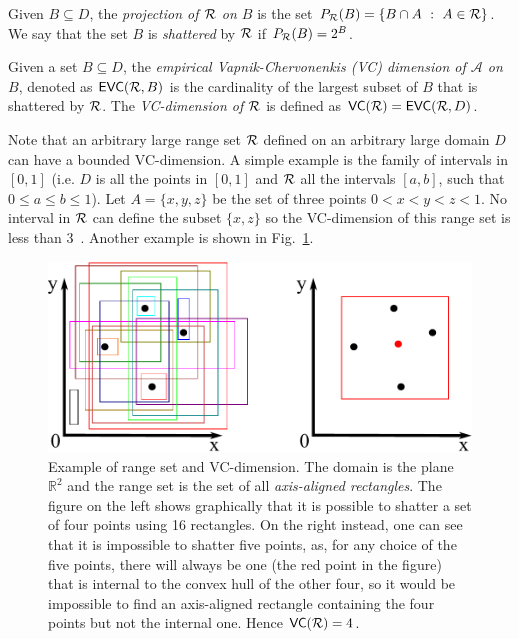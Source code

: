 Given $B\subseteq D$, the \emph{projection of $\mathcal{R}$ on $B$} is the set 
$P_{\mathcal{R}}(B)=\{ B\cap A ~:~ A\in\mathcal{R}\}$. We say that the set $B$ is
\emph{shattered} by $\mathcal{R}$ if $P_{\mathcal{R}}(B)=2^B$.

\begin{definition}\label{def:empvcdim}
  Given a set $B\subseteq D$, the \emph{empirical Vapnik-Chervonenkis
  (VC) dimension of $\mathcal{A}$ on $B$}, denoted as $\mathsf{EVC}(\mathcal{R},B)$ is
  the cardinality of the largest subset of $B$ that is shattered by
  $\mathcal{R}$. The \emph{VC-dimension of $\mathcal{R}$} is defined as $\mathsf{VC}(\mathcal{R})=\mathsf{EVC}(\mathcal{R},D)$.
\end{definition}

Note that an arbitrary large range set $\mathcal{R}$ defined on an arbitrary large
domain $D$ can have a bounded VC-dimension. A simple
example is the family of intervals in $[0,1]$ (i.e. $D$ is all the points in
$[0,1]$ and $\mathcal{R}$ all the intervals $[a,b]$, such that $0\leq a\leq b\leq 1$). Let
$A=\{x,y,z\}$ be the set of three points $0<x<y<z<1$. No interval in $\mathcal{R}$ can
define the subset $\{x,z\}$ so the VC-dimension of this range set is less than
3~\cite[Lemma 10.3.1]{Matousek02}. Another example is shown in
Fig.~\ref{fig:rectangles}.
\begin{figure}[ht]
  \centering
  \includegraphics[width=.7\textwidth,keepaspectratio]{rectangles}
  \caption{Example of range set and VC-dimension. The domain is the
  plane $\mathbb{R}^2$ and the range set is the set of all
  \emph{axis-aligned rectangles}. The figure on the left shows graphically that
  it is possible to shatter a set of four points using 16 rectangles. On the
  right instead, one can see that it is impossible to shatter five points, as,
  for any choice of the five points, there will always be one (the red point in
  the figure) that is internal to the convex hull of the other four, so it would
  be impossible to find an axis-aligned rectangle containing the four points
  but not the internal one. Hence $\mathsf{VC}(\mathcal{R})=4$.}
  \label{fig:rectangles}
\end{figure}

